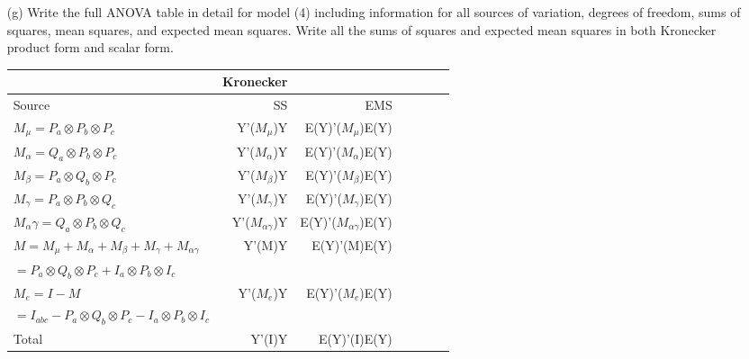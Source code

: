 \begin{itemize}
\item[(g)] Write the full ANOVA table in detail for model (4) including information for all
sources of variation, degrees of freedom, sums of squares, mean squares, and expected
mean squares. Write all the sums of squares and expected mean squares in both
Kronecker product form and scalar form.\\
\begin{tabular}{l r r r r r r }
& Kronecker & & & \\\hline
Source & SS & EMS  \\\hline
$M_\mu=P_a \otimes P_b \otimes P_c$ &  Y'($M_\mu$)Y & E(Y)'($M_\mu$)E(Y)  \\
$M_\alpha=Q_a \otimes P_b \otimes P_c$	&  Y'($M_\alpha$)Y & E(Y)'($M_\alpha$)E(Y) \\
$M_\beta= P_a \otimes Q_b \otimes P_c$	& Y'($M_\beta$)Y & E(Y)'($M_\beta$)E(Y) \\
$M_\gamma=P_a \otimes P_b \otimes Q_c$	& Y'($M_\gamma$)Y & E(Y)'($M_\gamma$)E(Y) \\
$M_\alpha\gamma =Q_a \otimes P_b \otimes Q_c$	& Y'($M_{\alpha\gamma}$)Y & E(Y)'($M_{\alpha\gamma}$)E(Y) \\
$M = M_{\mu}+M_{\alpha} + M_{\beta} + M_{\gamma} + M_{\alpha\gamma} $	& Y'(M)Y & E(Y)'(M)E(Y) \\
$= P_a \otimes Q_b \otimes P_c + I_a \otimes P_b \otimes I_c$  \\
$M_e = I-M$	& Y'($M_e$)Y & E(Y)'($M_e$)E(Y) \\
$= I_{abc}- P_a \otimes Q_b \otimes P_c - I_a \otimes P_b \otimes I_c$  \\
Total	& Y'(I)Y & E(Y)'(I)E(Y) \\
\hline
\end{tabular}\\


\end{itemize}

